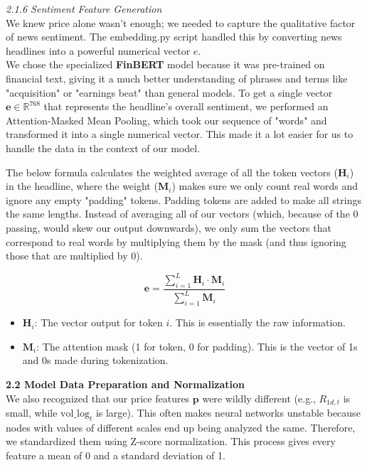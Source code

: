 \documentclass[letterpaper,12pt, twocolumn]{report}
\begin{document}
\noindent
\textit{2.1.6 Sentiment Feature Generation} \\
We knew price alone wasn’t enough; we needed to capture the qualitative factor of news sentiment. The
 embedding.py script handled this by converting news headlines into a powerful numerical vector $e$. \\

 \noindent
 We chose the specialized \textbf{FinBERT} model because it was pre-trained on financial text, giving it a much better understanding of phrases and terms like "acquisition" or "earnings beat" than general models. To get a single vector $\mathbf{e} \in \mathbb{R}^{768}$ that represents the headline's overall sentiment, we performed an  Attention-Masked Mean Pooling, which took our sequence of "words" and transformed it into a single numerical vector. This made it a lot easier for us to handle the data in the context of our model.

The below formula calculates the weighted average of all the token vectors ($\mathbf{H}_i$) in the headline, where the weight ($\mathbf{M}_i$) makes sure we only count real words and ignore any empty "padding" tokens. Padding tokens are added to make all strings the same lengths. Instead of averaging all of our vectors (which, because of the 0 passing, would skew our output downwards), we only sum the vectors that correspond to real words by multiplying them by the mask (and thus ignoring those that are multiplied by 0).

$$
\mathbf{e} = \frac{\sum_{i=1}^{L} \mathbf{H}_i \cdot \mathbf{M}_i}{\sum_{i=1}^{L} \mathbf{M}_i}
$$
\begin{itemize}
    \item $\mathbf{H}_i$: The vector output for token $i$. This is essentially the raw information.
    \item $\mathbf{M}_i$: The attention mask (1 for token, 0 for padding). This is the vector of 1s and 0s made during tokenization.
\end{itemize}



\noindent
\textbf{2.2 Model Data Preparation and Normalization}\\
We also recognized that our price features $\mathbf{p}$ were wildly different (e.g., $R_{1d, t}$ is small, while $\text{vol\_log}_t$ is large). This often makes neural networks unstable because nodes with values of different scales end up being analyzed the same. Therefore, we standardized them using Z-score normalization. This process gives every feature a mean of 0 and a standard deviation of 1.
\end{document}
